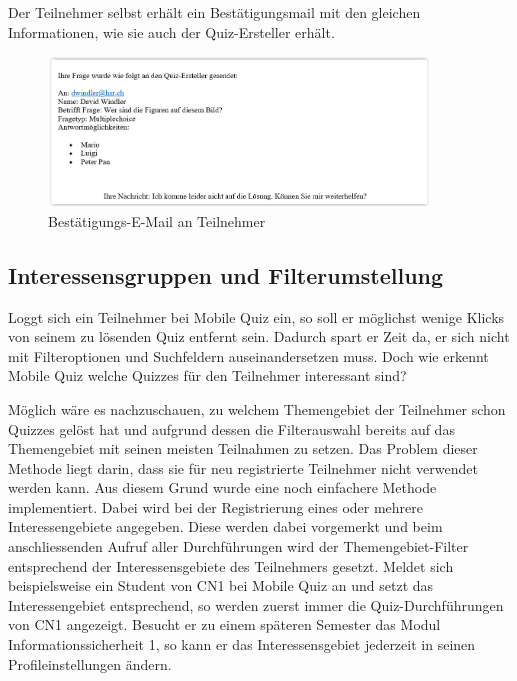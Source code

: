 Der Teilnehmer selbst erhält ein Bestätigungsmail mit den gleichen Informationen, wie sie auch der Quiz-Ersteller erhält.

\begin{figure}[H]
	\centering
	\includegraphics[width=0.9\textwidth]{Images/Feedback-Mail_Teilnehmer.PNG}
	\caption{Bestätigungs-E-Mail an Teilnehmer}
\end{figure}




\subsection{Interessensgruppen und Filterumstellung}
\label{InteressensgruppenUndFilterumstellung}
Loggt sich ein Teilnehmer bei Mobile Quiz ein, so soll er möglichst wenige Klicks von seinem zu lösenden Quiz entfernt sein. Dadurch spart er Zeit da, er sich nicht mit Filteroptionen und Suchfeldern auseinandersetzen muss. Doch wie erkennt Mobile Quiz welche Quizzes für den Teilnehmer interessant sind?

Möglich wäre es nachzuschauen, zu welchem Themengebiet der Teilnehmer schon Quizzes gelöst hat und aufgrund dessen die Filterauswahl bereits auf das Themengebiet mit seinen meisten Teilnahmen zu setzen. Das Problem dieser Methode liegt darin, dass sie für neu registrierte Teilnehmer nicht verwendet werden kann.
Aus diesem Grund wurde eine noch einfachere Methode implementiert. Dabei wird bei der Registrierung eines oder mehrere Interessengebiete angegeben. Diese werden dabei vorgemerkt und beim anschliessenden Aufruf aller Durchführungen wird der Themengebiet-Filter entsprechend der Interessensgebiete des Teilnehmers gesetzt. Meldet sich beispielsweise ein Student von \acrshort{CN1} bei Mobile Quiz an und setzt das Interessengebiet entsprechend, so werden zuerst immer die Quiz-Durchführungen von \acrshort{CN1} angezeigt. Besucht er zu einem späteren Semester das Modul Informationssicherheit 1, so kann er das Interessensgebiet jederzeit in seinen Profileinstellungen ändern.

